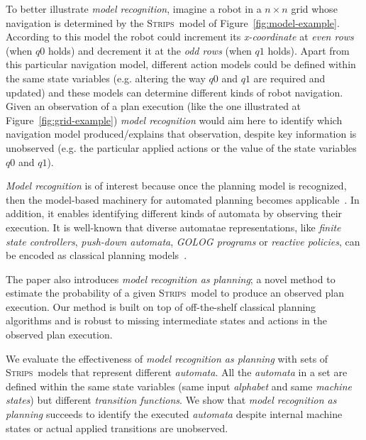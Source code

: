 \documentclass[letterpaper]{article} %
\newcommand{\strips}{\textsc{Strips}}     %
\begin{document}
To better illustrate {\em model recognition}, imagine a robot in a $n\times n$ grid whose navigation is determined by the \strips\ model of Figure~\ref{fig:model-example}. According to this model the robot could increment its {\em x-coordinate} at {\em even rows} (when {\tt\small $q0$} holds) and decrement it at the {\em odd rows} (when {\tt\small $q1$} holds). Apart from this particular navigation model, different action models could be defined within the same state variables (e.g. altering the way {\tt\small $q0$} and {\tt\small $q1$} are required and updated) and these models can determine different kinds of robot navigation. Given an observation of a plan execution (like the one illustrated at Figure~\ref{fig:grid-example}) {\em model recognition} would aim here to identify which navigation model produced/explains that observation, despite key information is unobserved (e.g. the particular applied actions or the value of the state variables {\small\tt $q0$} and {\small\tt $q1$}). 

{\em Model recognition} is of interest because once the planning model is recognized, then the model-based machinery for automated planning becomes applicable~\cite{ghallab2004automated}. In addition, it enables identifying different kinds of automata by observing their execution. It is well-known that diverse automatae representations, like {\em finite state controllers}, {\em push-down automata}, {\em {\sc GOLOG} programs} or {\em reactive policies}, can be encoded as classical planning models~\cite{baier2007exploiting,Geffner:FSM:AAAI10,ivankovic2015optimal,segovia2017generating}.

The paper also introduces {\em model recognition as planning}; a novel method to estimate the probability of a given \strips\ model to produce an observed plan execution. Our method is built on top of off-the-shelf classical planning algorithms and is robust to missing intermediate states and actions in the observed plan execution. 

We evaluate the effectiveness of {\em model recognition as planning} with sets of \strips\ models that represent different {\em automata}. All the {\em automata} in a set are defined within the same state variables (same input {\em alphabet} and same {\em machine states}) but different {\em transition functions}. We show that {\em model recognition as planning} succeeds to identify the executed {\em automata} despite internal machine states or actual applied transitions are unobserved.
\end{document}
